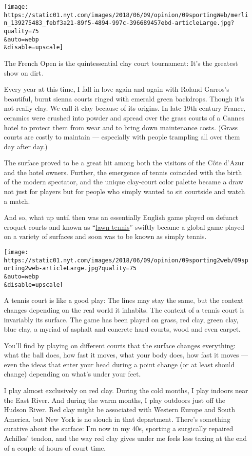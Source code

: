 \texttt{[image: https://static01.nyt.com/images/2018/06/09/opinion/09sportingWeb/merlin\_139275483\_febf3a21-89f5-4894-997c-396689457ebd-articleLarge.jpg?quality=75\\\&auto=webp\\\&disable=upscale]}

The French Open is the quintessential clay court tournament: It's the
greatest show on dirt.

Every year at this time, I fall in love again and again with Roland
Garros's beautiful, burnt sienna courts ringed with emerald green
backdrops. Though it's not really clay. We call it clay because of its
origins. In late 19th-century France, ceramics were crushed into powder
and spread over the grass courts of a Cannes hotel to protect them from
wear and to bring down maintenance costs. (Grass courts are costly to
maintain --- especially with people trampling all over them day after
day.)

The surface proved to be a great hit among both the visitors of the Côte
d'Azur and the hotel owners. Further, the emergence of tennis coincided
with the birth of the modern spectator, and the unique clay-court color
palette became a draw not just for players but for people who simply
wanted to sit courtside and watch a match.

And so, what up until then was an essentially English game played on
defunct croquet courts and known as
``\href{http://www.fundinguniverse.com/company-histories/the-all-england-lawn-tennis-croquet-club-history/}{lawn
tennis}'' swiftly became a global game played on a variety of surfaces
and soon was to be known as simply tennis.

\texttt{[image: https://static01.nyt.com/images/2018/06/09/opinion/09sporting2web/09sporting2web-articleLarge.jpg?quality=75\\\&auto=webp\\\&disable=upscale]}

A tennis court is like a good play: The lines may stay the same, but the
context changes depending on the real world it inhabits. The context of
a tennis court is invariably its surface. The game has been played on
grass, red clay, green clay, blue clay, a myriad of asphalt and concrete
hard courts, wood and even carpet.

You'll find by playing on different courts that the surface changes
everything: what the ball does, how fast it moves, what your body does,
how fast it moves --- even the ideas that enter your head during a point
change (or at least should change) depending on what's under your feet.

I play almost exclusively on red clay. During the cold months, I play
indoors near the East River. And during the warm months, I play outdoors
just off the Hudson River. Red clay might be associated with Western
Europe and South America, but New York is no slouch in that department.
There's something curative about the surface: I'm now in my 40s,
sporting a surgically repaired Achilles' tendon, and the way red clay
gives under me feels less taxing at the end of a couple of hours of
court time.

